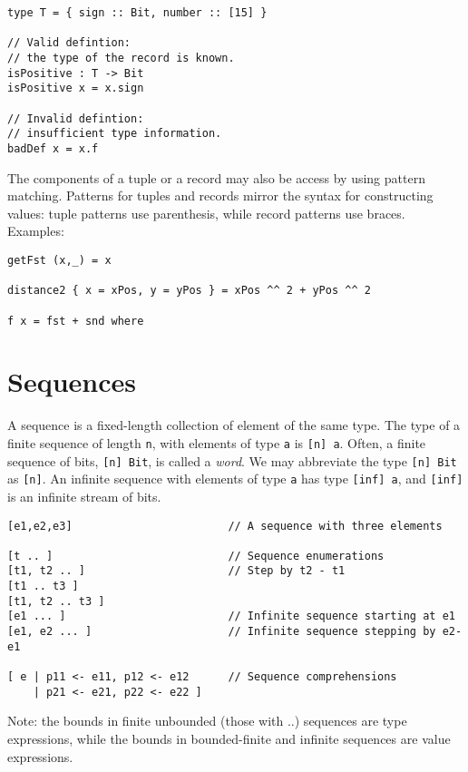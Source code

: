 \begin{verbatim}
type T = { sign :: Bit, number :: [15] }

// Valid defintion:
// the type of the record is known.
isPositive : T -> Bit
isPositive x = x.sign

// Invalid defintion:
// insufficient type information.
badDef x = x.f
\end{verbatim}

The components of a tuple or a record may also be access by using
pattern matching. Patterns for tuples and records mirror the syntax for
constructing values: tuple patterns use parenthesis, while record
patterns use braces. Examples:

\begin{verbatim}
getFst (x,_) = x

distance2 { x = xPos, y = yPos } = xPos ^^ 2 + yPos ^^ 2

f x = fst + snd where
\end{verbatim}

\section{Sequences}\label{sequences}

A sequence is a fixed-length collection of element of the same type. The
type of a finite sequence of length \texttt{n}, with elements of type
\texttt{a} is \texttt{{[}n{]} a}. Often, a finite sequence of bits,
\texttt{{[}n{]} Bit}, is called a \emph{word}. We may abbreviate the
type \texttt{{[}n{]} Bit} as \texttt{{[}n{]}}. An infinite sequence with
elements of type \texttt{a} has type \texttt{{[}inf{]} a}, and
\texttt{{[}inf{]}} is an infinite stream of bits.

\begin{verbatim}
[e1,e2,e3]                        // A sequence with three elements

[t .. ]                           // Sequence enumerations
[t1, t2 .. ]                      // Step by t2 - t1
[t1 .. t3 ]
[t1, t2 .. t3 ]
[e1 ... ]                         // Infinite sequence starting at e1
[e1, e2 ... ]                     // Infinite sequence stepping by e2-e1

[ e | p11 <- e11, p12 <- e12      // Sequence comprehensions
    | p21 <- e21, p22 <- e22 ]
\end{verbatim}

Note: the bounds in finite unbounded (those with ..) sequences are type
expressions, while the bounds in bounded-finite and infinite sequences
are value expressions.


